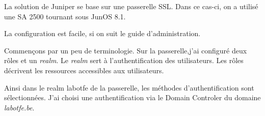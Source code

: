 La solution de Juniper se base sur une passerelle SSL.
Dans ce cas-ci, on a utilisé une SA 2500 tournant sous JunOS 8.1.

La configuration est facile, si on suit le guide d'administration.

Commençons par un peu de terminologie.
Sur la passerelle,j'ai configuré deux rôles et un \textit{realm}.
Le \textit{realm} sert à l'authentification des utilisateurs.
Les rôles décrivent les ressources accessibles aux utilisateurs.


Ainsi dans le realm labotfe de la passerelle, les méthodes d'authentification sont sélectionnées.
J'ai choisi une authentification via le Domain Controler du domaine \textit{labotfe.be}.